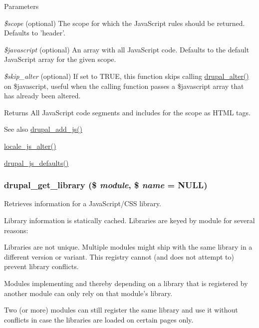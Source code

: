 \begin{DoxyParams}{Parameters}
\item[{\em \$scope}](optional) The scope for which the JavaScript rules should be returned. Defaults to 'header'. \item[{\em \$javascript}](optional) An array with all JavaScript code. Defaults to the default JavaScript array for the given scope. \item[{\em \$skip\_\-alter}](optional) If set to TRUE, this function skips calling \hyperlink{module_8inc_a0a8742a524bbb674b6c6a26755765007}{drupal\_\-alter()} on \$javascript, useful when the calling function passes a \$javascript array that has already been altered.\end{DoxyParams}
\begin{DoxyReturn}{Returns}
All JavaScript code segments and includes for the scope as HTML tags.
\end{DoxyReturn}
\begin{DoxySeeAlso}{See also}
\hyperlink{common_8inc_a623370a2c3c2de0390dab078d17dca02}{drupal\_\-add\_\-js()} 

\hyperlink{locale_8module_a8bb6cc68121ba7213df8d6a33b372853}{locale\_\-js\_\-alter()} 

\hyperlink{common_8inc_a55203a07884e02b18a3be2a630c3fab3}{drupal\_\-js\_\-defaults()} 
\end{DoxySeeAlso}
\hypertarget{common_8inc_aa535ac5edd443308d3b2812caf1a1b85}{
\subsubsection[{drupal\_\-get\_\-library}]{\setlength{\rightskip}{0pt plus 5cm}drupal\_\-get\_\-library (\$ {\em module}, \/  \$ {\em name} = {\ttfamily NULL})}}
\label{common_8inc_aa535ac5edd443308d3b2812caf1a1b85}
Retrieves information for a JavaScript/CSS library.

Library information is statically cached. Libraries are keyed by module for several reasons:
\begin{DoxyItemize}
\item Libraries are not unique. Multiple modules might ship with the same library in a different version or variant. This registry cannot (and does not attempt to) prevent library conflicts.
\item Modules implementing and thereby depending on a library that is registered by another module can only rely on that module's library.
\item Two (or more) modules can still register the same library and use it without conflicts in case the libraries are loaded on certain pages only.
\end{DoxyItemize}


